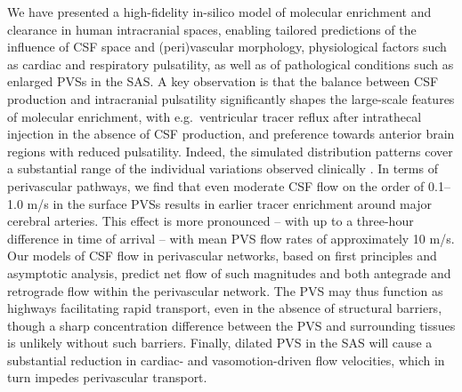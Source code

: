 \documentclass[fleqn,10pt]{wlscirep}
\begin{document}
We have presented a high-fidelity in-silico model of molecular
enrichment and clearance in human intracranial spaces, enabling
tailored predictions of the influence of CSF space and (peri)vascular
morphology, physiological factors such as cardiac and respiratory
pulsatility, as well as of pathological conditions such as enlarged
PVSs in the SAS. A key observation is that the balance between CSF
production and intracranial pulsatility significantly shapes the
large-scale features of molecular enrichment, with e.g.~ventricular
tracer reflux after intrathecal injection in the absence of CSF
production, and preference towards anterior brain regions with reduced
pulsatility. Indeed, the simulated distribution patterns cover a
substantial range of the individual variations observed clinically
\cite{ringstad2018brain}. In terms of perivascular pathways, we find
that even moderate CSF flow on the order of 0.1--1.0 \textmu m/s in
the surface PVSs results in earlier tracer enrichment around major
cerebral arteries. This effect is more pronounced -- with up to a
three-hour difference in time of arrival -- with mean PVS flow rates
of approximately 10 \textmu m/s. Our models of CSF flow in
perivascular networks, based on first principles and asymptotic
analysis, predict net flow of such magnitudes and both antegrade and
retrograde flow within the perivascular network. The PVS may thus
function as highways facilitating rapid transport, even in the absence
of structural barriers, though a sharp concentration difference
between the PVS and surrounding tissues is unlikely without such
barriers. Finally, dilated PVS in the SAS will cause a substantial reduction in
cardiac- and vasomotion-driven flow velocities, which in turn impedes
perivascular transport.

\end{document}

